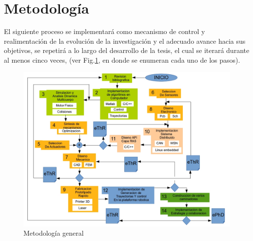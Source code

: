 \documentclass[12pt,twoside,onecolumn,letterpaper]{article}
\begin{document}
\section{Metodolog\'ia}
\label{sec:metodo}
El siguiente proceso se implementar\'a como mecanismo de control y realimentación de la evoluci\'on de la investigaci\'on y el adecuado avance hacia sus objetivos, se repetir\'a a lo largo del desarrollo de la tesis, el cual se iterar\'a durante al menos cinco veces, (ver Fig.\ref{fig:method}, en donde se enumeran cada uno de los pasos).
\begin{figure}[!htb]
  \centering
  \includegraphics[scale=0.42]{../images/metGen2.png}
  \caption{Metodolog\'ia general}
  \label{fig:method}
\end{figure}
\end{document}
